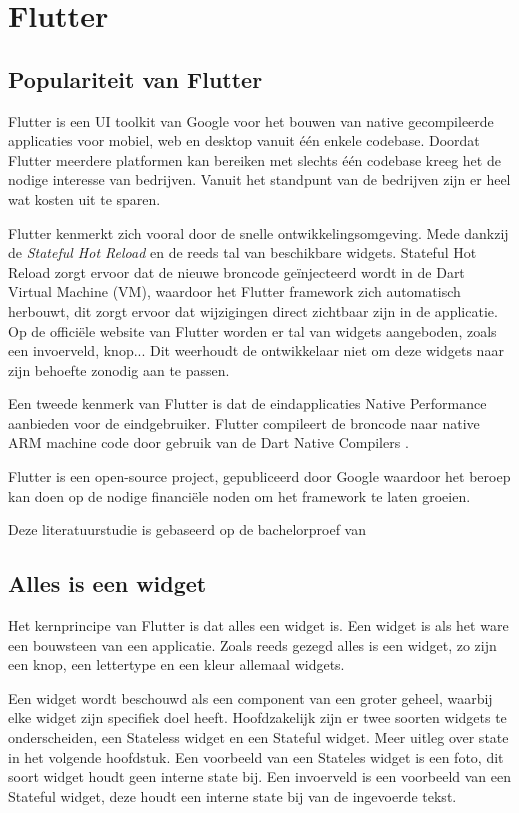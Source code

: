\section{Flutter}
\subsection{Populariteit van Flutter}
Flutter is een UI toolkit van Google voor het bouwen van native gecompileerde applicaties voor mobiel, web en desktop vanuit één enkele codebase. Doordat Flutter meerdere platformen kan bereiken met slechts één codebase kreeg het de nodige interesse van bedrijven. Vanuit het standpunt van de bedrijven zijn er heel wat kosten uit te sparen.

Flutter kenmerkt zich vooral door de snelle ontwikkelingsomgeving. Mede dankzij de \emph{Stateful Hot Reload} en de reeds tal van beschikbare widgets. Stateful Hot Reload zorgt ervoor dat de nieuwe broncode geïnjecteerd wordt in de Dart Virtual Machine (VM), waardoor het Flutter framework zich automatisch herbouwt, dit zorgt ervoor dat wijzigingen direct zichtbaar zijn in de applicatie. Op de officiële website van Flutter worden er tal van widgets aangeboden, zoals een invoerveld, knop... Dit weerhoudt de ontwikkelaar niet om deze widgets naar zijn behoefte zonodig aan te passen.

Een tweede kenmerk van Flutter is dat de eindapplicaties Native Performance aanbieden voor de eindgebruiker. Flutter compileert de broncode naar native ARM machine code door gebruik van de Dart Native Compilers \autocite{Dart}.

Flutter is een open-source project, gepubliceerd door Google waardoor het beroep kan doen op de nodige financiële noden om het framework te laten groeien. 

Deze literatuurstudie is gebaseerd op de bachelorproef van \autocite{Coninck2019}

\subsection{Alles is een widget}
Het kernprincipe van Flutter is dat alles een widget is. Een widget is als het ware een bouwsteen van een applicatie. Zoals reeds gezegd alles is een widget, zo zijn een knop, een lettertype en een kleur allemaal widgets. 

Een widget wordt beschouwd als een component van een groter geheel, waarbij elke widget zijn specifiek doel heeft.
Hoofdzakelijk zijn er twee soorten widgets te onderscheiden, een Stateless widget en een Stateful widget. Meer uitleg over state in het volgende hoofdstuk. Een voorbeeld van een Stateles widget is een foto, dit soort widget houdt geen interne state bij. Een invoerveld is een voorbeeld van een Stateful widget, deze houdt een interne state bij van de ingevoerde tekst. 
\newline

